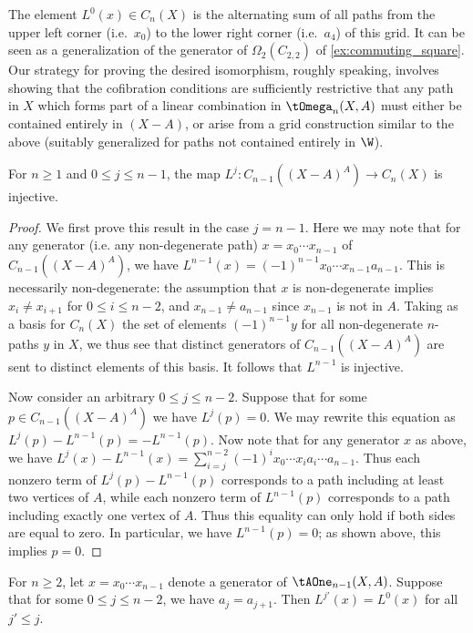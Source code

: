 The element $L^0(x) \in C_n(X)$ is the alternating sum of all paths from the upper left corner (i.e.~$x_0$) to the lower right corner (i.e.~$a_4$) of this grid. 
It can be seen as a generalization of the generator of $\Omega_2(C_{2,2})$ of \cref{ex:commuting_square}.
Our strategy for proving the desired isomorphism, roughly speaking, involves showing that the cofibration conditions are sufficiently restrictive that any path in $X$ which forms part of a linear combination in $\tOmega_n(X,A)$ must either be contained entirely in $(X - A)$, or arise from a grid construction similar to the above (suitably generalized for paths not contained entirely in $\W$).

\begin{lemma}\label{L-injective}
For $n \geq 1$ and $0 \leq j \leq n-1$, the map $L^j \colon C_{n-1}((X - A)^A) \to C_{n}(X)$ is injective.
\end{lemma}

\begin{proof}
We first prove this result in the case $j = n-1$. Here we may note that for any generator (i.e.  any non-degenerate path) $x = x_0 \cdots x_{n-1}$ of $C_{n-1}((X - A)^A)$, we have $L^{n-1}(x) = (-1)^{n-1} x_0 \cdots x_{n-1} a_{n-1}$. This is necessarily non-degenerate: the assumption that $x$ is non-degenerate implies $x_i \neq x_{i+1}$ for $0 \leq i \leq n-2$, and $x_{n-1} \neq a_{n-1}$ since $x_{n-1}$ is not in $A$. Taking as a basis for $C_n(X)$ the set of elements $(-1)^{n-1} y$ for all non-degenerate $n$-paths $y$ in $X$, we thus see that distinct generators of $C_{n-1}((X-A)^A)$ are sent to distinct elements of this basis. It follows that $L^{n-1}$ is injective.

Now consider an arbitrary $0 \leq j \leq n-2$. Suppose that for some $p \in C_{n-1}((X - A)^A)$ we have $L^j(p) = 0$. We may rewrite this equation as $L^j(p) - L^{n-1}(p) = -L^{n-1}(p)$. Now note that for any generator $x$ as above, we have $L^j(x) - L^{n-1}(x) = \sum_{i = j}^{n-2} (-1)^ix_0 \cdots x_i a_i \cdots a_{n-1}$.  Thus each nonzero term of $L^j(p) - L^{n-1}(p)$ corresponds to a path including at least two vertices of $A$, while each nonzero term of $L^{n-1}(p)$ corresponds to a path including exactly one vertex of $A$. Thus this equality can only hold if both sides are equal to zero. In particular, we have $L^{n-1}(p) = 0$; as shown above, this implies $p = 0$.
\end{proof}

\begin{lemma}\label{L-truncate-pi}
For $n \geq 2$, let $x = x_0 \cdots x_{n-1}$ denote a generator of $\tAOne_{n-1}(X,A)$. Suppose that for some $0 \leq j \leq n-2$, we have $a_j = a_{j+1}$. Then $L^{j'}(x) = L^0(x)$ for all $j' \leq j$.
\end{lemma}


